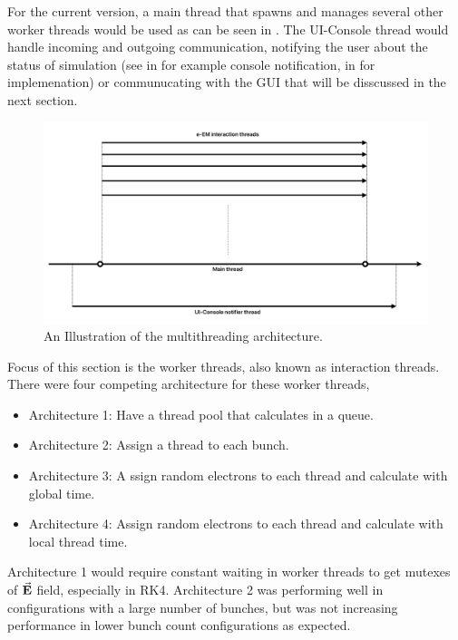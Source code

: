 \documentclass[a4paper,oneside,12pt]{report}
\numberwithin{equation}{chapter}
\begin{document}
{For the current version, a main thread that spawns and manages several other worker threads would be used as can be seen in .
The UI-Console thread would handle incoming and outgoing communication, notifying the user about the status of simulation 
(see  in  for example console notification,  in  for implemenation)
or communucating with the GUI that will be disscussed in the next section.

\begin{figure}[H]
    \centering
    \includegraphics[width=\linewidth]{./figures/illustrations/multh_arc.png}
    \vspace{20pt}
    \caption{An Illustration of the multithreading architecture.}
    \label{fig:multh_illustration}
\end{figure}

Focus of this section is the worker threads, also known as \eEM interaction threads.
There were four competing architecture for these worker threads,
\begin{itemize}
    \item Architecture 1: Have a thread pool that calculates \eEM in a queue. 
    \item Architecture 2: Assign a thread to each bunch.
    \item Architecture 3: A ssign random electrons to each thread and calculate \eEM with global time.
    \item Architecture 4: Assign random electrons to each thread and calculate \eEM with local thread time.
\end{itemize}

Architecture 1 would require constant waiting in worker threads to get mutexes of $\vec{\textbf{E}}$ field, especially in RK4.
\clearpage
Architecture 2 was performing well in configurations with a large number of bunches, but was not increasing performance in lower bunch count configurations as expected.

}
\end{document}
